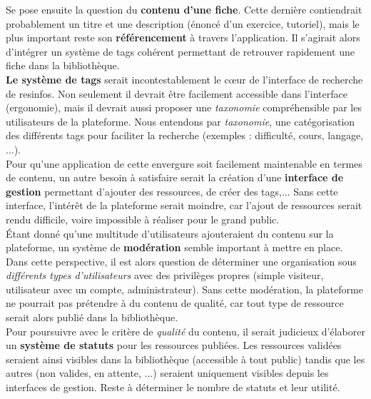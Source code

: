Se pose ensuite la question du \textbf{contenu d'une \gls{fiche}}. Cette dernière contiendrait probablement un titre et une description (énoncé d'un exercice, tutoriel), mais le plus important reste son \textbf{référencement} à travers l'application. Il s'agirait alors d'intégrer un système de \glspl{tag} cohérent permettant de retrouver rapidement une \gls{fiche} dans la bibliothèque.\\

\textbf{Le système de \glspl{tag}} serait incontestablement le cœur de l'interface de recherche de \glspl{resinfo}. Non seulement il devrait être facilement accessible dans l'interface (ergonomie), mais il devrait aussi proposer une \textit{taxonomie} compréhensible par les utilisateurs de la plateforme. Nous entendons par \textit{taxonomie}, une catégorisation des différents \glspl{tag} pour faciliter la recherche (exemples : difficulté, cours, langage, ...).\\

Pour qu'une application de cette envergure soit facilement maintenable en termes de contenu, un autre besoin à satisfaire serait la création d'une \textbf{interface de gestion} permettant d'ajouter des ressources, de créer des \glspl{tag},... Sans cette interface, l'intérêt de la plateforme serait moindre, car l'ajout de ressources serait rendu difficile, voire impossible à réaliser pour le grand public.\\

Étant donné qu'une multitude d'utilisateurs ajouteraient du contenu sur la plateforme, un système de \textbf{modération} semble important à mettre en place. Dans cette perspective, il est alors question de déterminer une organisation sous \textit{différents types d'utilisateurs} avec des privilèges propres (simple visiteur, utilisateur avec un compte, administrateur). Sans cette modération, la plateforme ne pourrait pas prétendre à du contenu de qualité, car tout type de ressource serait alors publié dans la bibliothèque.\\

Pour poursuivre avec le critère de \textit{qualité} du contenu, il serait judicieux d'élaborer un \textbf{système de statuts} pour les ressources publiées. Les ressources validées seraient ainsi visibles dans la bibliothèque (accessible à tout public) tandis que les autres (non valides, en attente, ...) seraient uniquement visibles depuis les interfaces de gestion. Reste à déterminer le nombre de statuts et leur utilité.\\

